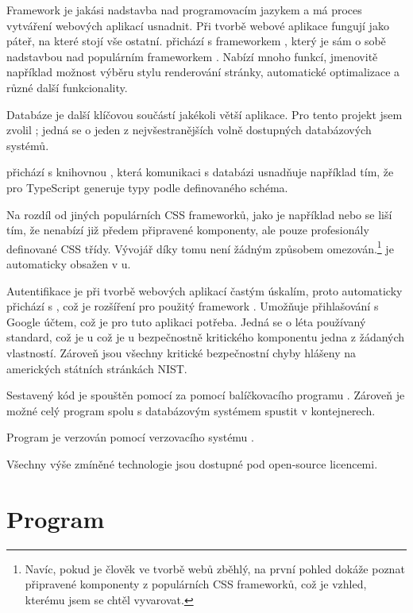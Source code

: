 Framework je jakási nadstavba nad programovacím jazykem a má proces vytváření webových aplikací usnadnit. Při tvorbě webové aplikace fungují jako páteř, na které stojí vše ostatní.  přichází s frameworkem , který je sám o sobě nadstavbou nad populárním frameworkem . Nabízí mnoho funkcí, jmenovitě například možnost výběru stylu renderování stránky, automatické optimalizace a různé další funkcionality.\cite{nextjs}


Databáze je další klíčovou součástí jakékoli větší aplikace. Pro tento projekt jsem zvolil ; jedná se o jeden z nejvšestranějších volně dostupných databázových systémů.

 přichází s knihovnou , která komunikaci s databázi usnadňuje například tím, že pro TypeScript generuje typy podle definovaného schéma.

Na rozdíl od jiných populárních CSS frameworků, jako je například  nebo  se  liší tím, že nenabízí již předem připravené komponenty, ale pouze profesionály definované CSS třídy. Vývojář díky tomu není žádným způsobem omezován.\footnote{Navíc, pokud je člověk ve tvorbě webů zběhlý, na první pohled dokáže poznat připravené komponenty z populárních CSS  frameworků, což je vzhled, kterému jsem se chtěl vyvarovat.}\cite{tailwind}  je automaticky obsažen v u.

Autentifikace je při tvorbě webových aplikací častým úskalím, proto  automaticky přichází s , což je rozšíření pro použitý framework . Umožňuje přihlašování s Google účtem, což je pro tuto aplikaci potřeba. Jedná se o léta používaný standard, což je u což je u bezpečnostně kritického komponentu jedna z žádaných vlastností. Zároveň jsou všechny kritické bezpečnostní chyby hlášeny na amerických státních stránkách NIST.

Sestavený kód je spouštěn pomocí  za pomocí balíčkovacího programu . Zároveň je možné celý program spolu s databázovým systémem spustit v  kontejnerech.

Program je verzován pomocí verzovacího systému .

Všechny výše zmíněné technologie jsou dostupné pod open-source licencemi.

\section{Program}

